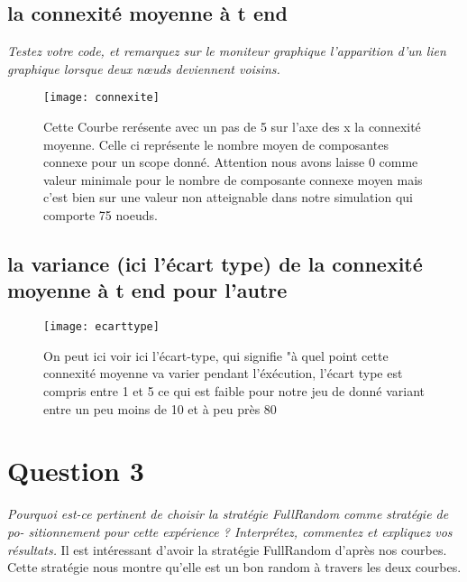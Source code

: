 \documentclass[11pt,a4paper,sans]{report}
\begin{document}
	\subsection{la connexité moyenne à t end}
	\par\textit{Testez votre code, et remarquez sur le moniteur graphique l’apparition d’un lien graphique lorsque deux nœuds deviennent voisins.}
	\begin{figure}[H]
		\centering
		\texttt{[image: connexite]}
		\caption{Cette Courbe rerésente avec un pas de 5 sur l'axe des x la connexité moyenne. Celle ci représente le nombre moyen de composantes connexe pour un scope donné. Attention nous avons laisse 0 comme valeur minimale pour le nombre de composante connexe moyen mais c'est bien sur une valeur non atteignable dans notre simulation qui comporte 75 noeuds.}
	\end{figure}


	\subsection{la variance (ici l'écart type) de la connexité moyenne à t end pour l’autre}
	\begin{figure}[H]
		\centering
		\texttt{[image: ecarttype]}
		\caption{On peut ici voir ici l'écart-type, qui signifie "à quel point cette connexité moyenne va varier pendant l'éxécution, l'écart type est compris entre 1 et 5 ce qui est faible pour notre jeu de donné variant entre un peu moins de 10 et à peu près 80 }
	\end{figure}



	\section{Question 3}
	\textit{Pourquoi est-ce pertinent de choisir la stratégie FullRandom comme stratégie de po- sitionnement pour cette expérience ?  Interprétez, commentez et expliquez vos résultats.}
	Il est intéressant d'avoir la stratégie FullRandom d'après nos courbes. Cette stratégie nous montre qu'elle est un bon random à travers les deux courbes.
	
\end{document}
